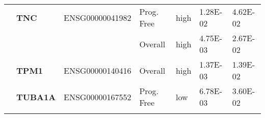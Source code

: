 {\begin{longtable}{|>{\bfseries}p{3cm}|>{\bfseries}p{1.9cm}|p{3cm}|p{2cm}|p{2cm}|p{1.5cm}|p{1.5cm}|}
        \hhline{~------}
                                                                & TNC      & ENSG00000041982 & Prog. Free & high & 1.28E-02 & 4.62E-02 \\
        \hhline{~~~----}
                                                                &          &                 & Overall    & high & 4.75E-03 & 2.67E-02 \\
        \hhline{~------}
                                                                & TPM1     & ENSG00000140416 & Overall    & high & 1.37E-03 & 1.39E-02 \\
        \hhline{~------}
                                                                & TUBA1A   & ENSG00000167552 & Prog. Free & low  & 6.78E-03 & 3.60E-02 \\
        \hhline{~------}






        \hline
    \end{longtable}
}


\newpage
